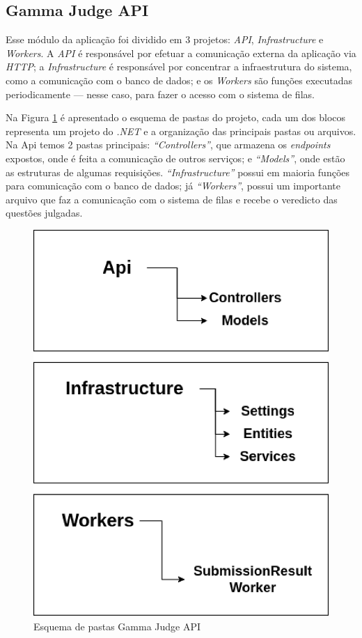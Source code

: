 \subsection{Gamma Judge API}
\label{sec:gammaJudgeApi}

Esse módulo da aplicação foi dividido em 3 projetos: \textit{API}, \textit{Infrastructure} e \textit{Workers}. A \textit{API} é responsável por efetuar a comunicação externa da aplicação via \textit{HTTP}; a \textit{Infrastructure} é responsável por concentrar a infraestrutura do sistema, como a comunicação com o banco de dados; e os \textit{Workers} são funções executadas periodicamente — nesse caso, para fazer o acesso com o sistema de filas.

Na Figura \ref{fig:judge_ui_folders} é apresentado o esquema de pastas do projeto, cada um dos blocos representa um projeto do \textit{.NET} e a organização das principais pastas ou arquivos. Na Api temos 2 pastas principais: \textit{“Controllers”}, que armazena os \textit{endpoints} expostos, onde é feita a comunicação de outros serviços; e \textit{“Models”}, onde estão as estruturas de algumas requisições. \textit{“Infrastructure”} possui em maioria funções para comunicação com o banco de dados; já  \textit{“Workers”}, possui um importante arquivo que faz a comunicação com o sistema de filas e recebe o veredicto das questões julgadas.

\begin{figure}[H]
    \centering
    \includegraphics[keepaspectratio=true,scale=0.5]{figuras/gamma_judge_api_folders.eps}
    \caption{Esquema de pastas Gamma Judge API}
    \label{fig:judge_ui_folders}
\end{figure}

